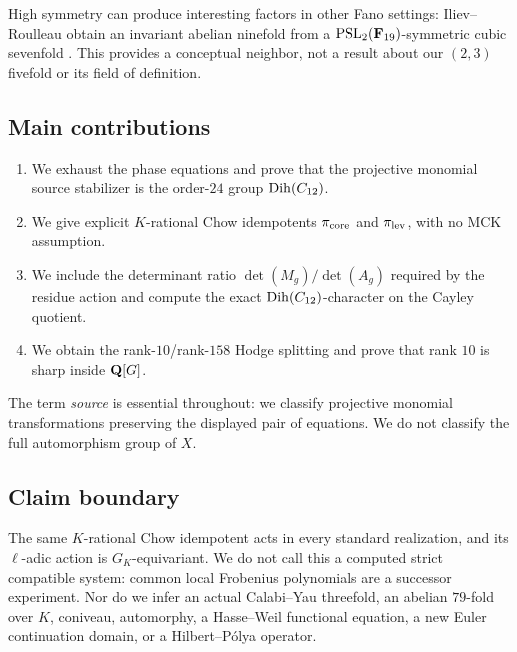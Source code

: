 High symmetry can produce interesting factors in other Fano settings:
Iliev--Roulleau obtain an invariant abelian ninefold from a
\(\mathrm{PSL}_2(\mathbf F_{19})\)-symmetric cubic sevenfold
\cite[abstract, Theorem~1, and Corollary~10]{IlievRoulleau2013}.  This
provides a conceptual neighbor, not a
result about our \((2,3)\) fivefold or its field of definition.

\subsection*{Main contributions}

\begin{enumerate}[leftmargin=*]
\item We exhaust the phase equations and prove that the projective
monomial source stabilizer is the order-\(24\) group
\(\operatorname{Dih}(C_{12})\).
\item We give explicit \(K\)-rational Chow idempotents
\(\pi_{\mathrm{core}}\) and \(\pi_{\mathrm{lev}}\), with no MCK assumption.
\item We include the determinant ratio
\(\det(M_g)/\det(A_g)\) required by the residue action and compute the
exact \(\operatorname{Dih}(C_{12})\)-character on the Cayley quotient.
\item We obtain the rank-\(10\)/rank-\(158\) Hodge splitting and prove
that rank \(10\) is sharp inside \(\mathbf Q[G]\).
\end{enumerate}

The term \emph{source} is essential throughout: we classify projective
monomial transformations preserving the displayed pair of equations.
We do not classify the full automorphism group of \(X\).

\subsection*{Claim boundary}

The same \(K\)-rational Chow idempotent acts in every standard
realization, and its \(\ell\)-adic action is \(G_K\)-equivariant.  We do
not call this a computed strict compatible system: common local
Frobenius polynomials are a successor experiment.  Nor do we infer an
actual Calabi--Yau threefold, an abelian \(79\)-fold over \(K\),
coniveau, automorphy, a Hasse--Weil functional equation, a new Euler
continuation domain, or a Hilbert--P\'olya operator.
